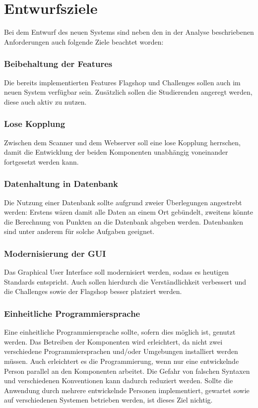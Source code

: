 \section{Entwurfsziele} \label{sec:Entwurfsziele}

Bei dem Entwurf des neuen Systems sind neben den in der Analyse beschriebenen Anforderungen auch folgende Ziele beachtet worden:

\subsubsection{Beibehaltung der Features}
Die bereits implementierten Features Flagshop und Challenges sollen auch im neuen System verfügbar sein. Zusätzlich sollen die Studierenden angeregt werden, diese auch aktiv zu nutzen.

\subsubsection{Lose Kopplung}
Zwischen dem Scanner und dem Webserver soll eine lose Kopplung herrschen, damit die Entwicklung der beiden Komponenten unabhängig voneinander fortgesetzt werden kann.

\subsubsection{Datenhaltung in Datenbank}
Die Nutzung einer Datenbank sollte aufgrund zweier Überlegungen angestrebt werden: Erstens wären damit alle Daten an einem Ort gebündelt, zweitens könnte die Berechnung von Punkten an die Datenbank abgeben werden. Datenbanken sind unter anderem für solche Aufgaben geeignet.

\subsubsection{Modernisierung der GUI}
Das Graphical User Interface soll modernisiert werden, sodass es heutigen Standards entspricht. Auch sollen hierdurch die Verständlichkeit verbessert und die Challenges sowie der Flagshop besser platziert werden.

\subsubsection{Einheitliche Programmiersprache}
Eine einheitliche Programmiersprache sollte, sofern dies möglich ist, genutzt werden. Das Betreiben der Komponenten wird erleichtert, da nicht zwei verschiedene Programmiersprachen und/oder Umgebungen installiert werden müssen. Auch erleichtert es die Programmierung, wenn nur eine entwickelnde Person parallel an den Komponenten arbeitet. Die Gefahr von falschen Syntaxen und verschiedenen Konventionen kann dadurch reduziert werden. Sollte die Anwendung durch mehrere entwickelnde Personen implementiert, gewartet sowie auf verschiedenen Systemen betrieben werden, ist dieses Ziel nichtig.

